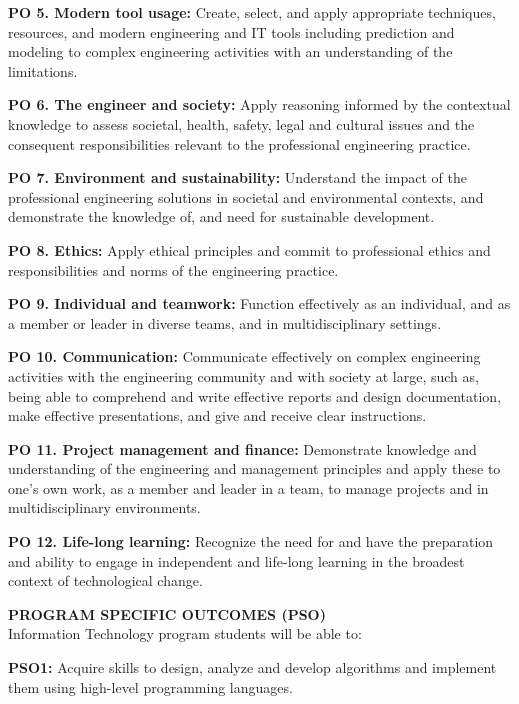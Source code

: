 \par \noindent
\textbf{PO 5. Modern tool usage:} Create, select, and apply appropriate techniques, resources, and modern engineering and IT tools including prediction and modeling to complex engineering activities with an understanding of the limitations.
\par \noindent
\textbf{PO 6. The engineer and society:} Apply reasoning informed by the contextual knowledge to assess societal, health, safety, legal and cultural issues and the consequent responsibilities relevant to the professional engineering practice.
\par \noindent
\textbf{PO 7. Environment and sustainability:} Understand the impact of the professional engineering solutions in societal and environmental contexts, and demonstrate the knowledge of, and need for sustainable development.
\par \noindent
\textbf{PO 8. Ethics:} Apply ethical principles and commit to professional ethics and responsibilities and norms of the engineering practice.
\par \noindent
\textbf{PO 9. Individual and teamwork:} Function effectively as an individual, and as a member or leader in diverse teams, and in multidisciplinary settings.
\par \noindent
\textbf{PO 10. Communication:} Communicate effectively on complex engineering activities with the engineering community and with society at large, such as, being able to comprehend and write effective reports and design documentation, make effective presentations, and give and receive clear instructions.
\par \noindent
\textbf{PO 11. Project management and finance:} Demonstrate knowledge and understanding of the engineering and management principles and apply these to one’s own work, as a member and leader in a team, to manage projects and in multidisciplinary environments.
\par \noindent
\textbf{PO 12. Life-long learning:} Recognize the need for and have the preparation and ability to engage in independent and life-long learning in the broadest context of technological change.
\par\noindent
\textbf{PROGRAM SPECIFIC OUTCOMES (PSO)}\\\noindent
Information Technology program students will be able to:
\par\noindent
\textbf{PSO1:} Acquire skills to design, analyze and develop algorithms and implement them using high-level programming languages.
\par\noindent
